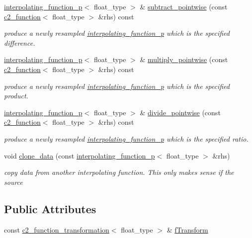 \begin{DoxyCompactItemize}
\hyperlink{classinterpolating__function__p}{interpolating\+\_\+function\+\_\+p}$<$ float\+\_\+type $>$ \& \hyperlink{classinterpolating__function__p_aa27983f5383b557005bc49d21cc268fa}{subtract\+\_\+pointwise} (const \hyperlink{classc2__function}{c2\+\_\+function}$<$ float\+\_\+type $>$ \&rhs) const 
\begin{DoxyCompactList}\small\item\em produce a newly resampled \hyperlink{classinterpolating__function__p}{interpolating\+\_\+function\+\_\+p} which is the specified difference. \end{DoxyCompactList}\item 
\hyperlink{classinterpolating__function__p}{interpolating\+\_\+function\+\_\+p}$<$ float\+\_\+type $>$ \& \hyperlink{classinterpolating__function__p_a5640f0ebe0ac71481ccb4d8fd1405c72}{multiply\+\_\+pointwise} (const \hyperlink{classc2__function}{c2\+\_\+function}$<$ float\+\_\+type $>$ \&rhs) const 
\begin{DoxyCompactList}\small\item\em produce a newly resampled \hyperlink{classinterpolating__function__p}{interpolating\+\_\+function\+\_\+p} which is the specified product. \end{DoxyCompactList}\item 
\hyperlink{classinterpolating__function__p}{interpolating\+\_\+function\+\_\+p}$<$ float\+\_\+type $>$ \& \hyperlink{classinterpolating__function__p_aaf55fce715316d9e25415d1ad9432385}{divide\+\_\+pointwise} (const \hyperlink{classc2__function}{c2\+\_\+function}$<$ float\+\_\+type $>$ \&rhs) const 
\begin{DoxyCompactList}\small\item\em produce a newly resampled \hyperlink{classinterpolating__function__p}{interpolating\+\_\+function\+\_\+p} which is the specified ratio. \end{DoxyCompactList}\item 
void \hyperlink{classinterpolating__function__p_ab73a92cc7c402a1cf5a2653fef17f662}{clone\+\_\+data} (const \hyperlink{classinterpolating__function__p}{interpolating\+\_\+function\+\_\+p}$<$ float\+\_\+type $>$ \&rhs)
\begin{DoxyCompactList}\small\item\em copy data from another interpolating function. This only makes sense if the source \end{DoxyCompactList}\end{DoxyCompactItemize}
\subsection*{Public Attributes}
\begin{DoxyCompactItemize}
\item 
const \hyperlink{classc2__function__transformation}{c2\+\_\+function\+\_\+transformation}$<$ float\+\_\+type $>$ \& \hyperlink{classinterpolating__function__p_a51af1a7077b6f904abe2ede816972eb7}{f\+Transform}
\end{DoxyCompactItemize}
